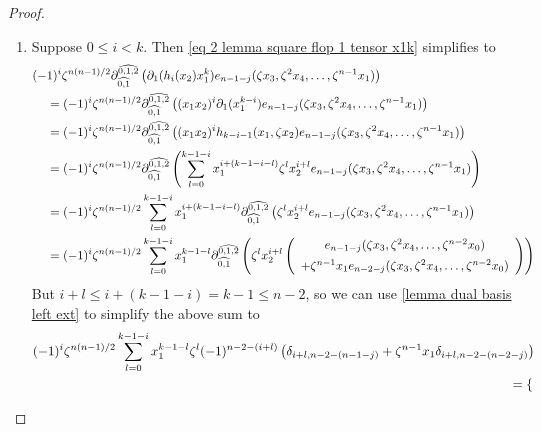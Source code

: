 \begin{proof}
\begin{enumerate}
    \item[Case 3:]  Suppose $0\leq i< k$. Then \eqref{eq 2 lemma square flop 1 tensor x1k} simplifies to 
    \begin{align*}
        (-&1)^i\zeta^{n(n-1)/2} \ddm{0,1,2}{0,1}\left( \dd_1(h_i(x_2)x_1^k)e_{n-1-j}(\zeta x_3, \zeta^2 x_4, \ldots , \zeta^{n-1}x_1) \right)\\
        &=(-1)^i\zeta^{n(n-1)/2} \ddm{0,1,2}{0,1}\left((x_1x_2)^i \dd_1(x_1^{k-i})e_{n-1-j}(\zeta x_3, \zeta^2 x_4, \ldots , \zeta^{n-1}x_1) \right)\\
        &= (-1)^i\zeta^{n(n-1)/2}\ddm{0,1,2}{0,1}\left((x_1x_2)^i h_{k-i-1}(x_1, \zeta x_2)e_{n-1-j}(\zeta x_3, \zeta^2 x_4, \ldots , \zeta^{n-1}x_1) \right)\\
        &=(-1)^i\zeta^{n(n-1)/2}\ddm{0,1,2}{0,1}\left(\sum_{l=0}^{k-1-i}x_1^{i+(k-1-i-l)} \zeta^l x_2^{i+l} e_{n-1-j}(\zeta x_3, \zeta^2 x_4, \ldots , \zeta^{n-1}x_1) \right)\\
        &=(-1)^i\zeta^{n(n-1)/2}\sum_{l=0}^{k-1-i}x_1^{i+(k-1-i-l)} \ddm{0,1,2}{0,1}\left(\zeta^l x_2^{i+l} e_{n-1-j}(\zeta x_3, \zeta^2 x_4, \ldots , \zeta^{n-1}x_1) \right)\\
        &=(-1)^i\zeta^{n(n-1)/2}\sum_{l=0}^{k-1-i}x_1^{k-1-l} \ddm{0,1,2}{0,1}\left(\zeta^l x_2^{i+l}
        \left(\begin{array}{c}
    e_{n-1-j}(\zeta x_3, \zeta^2 x_4, \ldots , \zeta^{n-2}x_0) \vspace{5pt}\\
    + \zeta^{n-1}x_1e_{n-2-j}(\zeta x_3, \zeta^2 x_4, \ldots , \zeta^{n-2}x_0)
    \end{array}\right) \right)
    \end{align*}
    But $i+l\leq i+(k-1-i) =k-1 \leq n-2$, so we can use \cref{lemma dual basis left ext} to simplify the above sum to
    \begin{align}
     \notag (-1)^i\zeta^{n(n-1)/2}\sum_{l=0}^{k-1-i}x_1^{k-1-l}\zeta^l (-1)^{n-2-(i+l)}\left(\delta_{i+l, n-2-(n-1-j)}+\zeta^{n-1}x_1 \delta_{i+l, n-2-(n-2-j)} \right)\\
     \notag =\begin{cases}

\end{cases}
\end{align}
\end{enumerate}
\end{proof}
